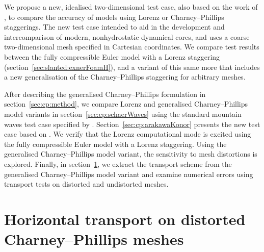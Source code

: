 We propose a new, idealised two-dimensional test case, also based on the work of \citet{arakawa-konor1996}, to compare the accuracy of models using Lorenz or Charney--Phillips staggerings.  The new test case intended to aid in the development and intercomparison of modern, nonhydrostatic dynamical cores, and uses a coarse two-dimensional mesh specified in Cartesian coordinates.
We compare test results between the fully compressible Euler model with a Lorenz staggering (section~\ref{sec:slanted:exnerFoamH}), and a variant of this same more that includes a new generalisation of the Charney--Phillips staggering for arbitrary meshes.

After describing the generalised Charney--Phillips formulation in section~\ref{sec:cp:method}, we compare Lorenz and generalised Charney--Phillips model variants in section~\ref{sec:cp:schaerWaves} using the standard mountain waves test case specified by \citet{schaer2002}.
Section~\ref{sec:cp:arakawaKonor} presents the new test case based on \citet{arakawa-konor1996}. We verify that the Lorenz computational mode is excited using the fully compressible Euler model with a Lorenz staggering.  Using the generalised Charney--Phillips model variant, the sensitivity to mesh distortions is explored.  Finally, in section~\ref{sec:cp:advection}, we extract the transport scheme from the generalised Charney--Phillips model variant and examine numerical errors using transport tests on distorted and undistorted meshes.





\section{Horizontal transport on distorted Charney--Phillips meshes}
\label{sec:cp:advection}

